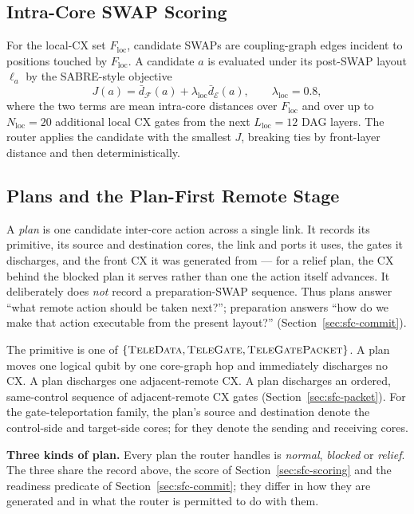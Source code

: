 \subsection{Intra-Core SWAP Scoring}
\label{sec:sfc-intra}

For the local-CX set $F_\mathrm{loc}$, candidate SWAPs are coupling-graph
edges incident to positions touched by $F_\mathrm{loc}$.  A candidate $a$ is
evaluated under its post-SWAP layout $\ell_a$ by the SABRE-style objective
\begin{equation}
J(a)=\bar d_{\mathcal F}(a)+\lambda_\mathrm{loc}\bar d_{\mathcal E}(a),
\qquad \lambda_\mathrm{loc}=0.8,
\label{eq:sfc-local}
\end{equation}
where the two terms are mean intra-core distances over $F_\mathrm{loc}$ and
over up to $N_\mathrm{loc}=20$ additional local CX gates from the next
$L_\mathrm{loc}=12$ DAG layers.  The router applies the candidate with the
smallest $J$, breaking ties by front-layer distance and then deterministically.

\subsection{Plans and the Plan-First Remote Stage}
\label{sec:sfc-plan-first}
\label{sec:sfc-relief}

A \emph{plan} is one candidate inter-core action across a single link.  It
records its primitive, its source and destination cores, the link and ports it
uses, the gates it discharges, and the front CX it was generated from --- for
a relief plan, the CX behind the blocked plan it serves rather than one the
action itself advances.  It deliberately does \emph{not} record a
preparation-SWAP sequence.  Thus plans answer ``what remote action should be
taken next?''; preparation answers ``how do we make that action executable
from the present layout?'' (Section~\ref{sec:sfc-commit}).

The primitive is one of $\{\textsc{TeleData}{},\textsc{TeleGate}{},\textsc{TeleGatePacket}{}\}$.
A \TeleData{} plan moves one logical qubit by one core-graph hop and
immediately discharges no CX.  A \TeleGate{} plan discharges one
adjacent-remote CX.  A \TeleGatePacket{} plan discharges an ordered,
same-control sequence of adjacent-remote CX gates
(Section~\ref{sec:sfc-packet}).  For the gate-teleportation
family, the plan's source and destination denote the control-side and
target-side cores; for \TeleData{} they denote the sending and receiving cores.

\textbf{Three kinds of plan.}  Every plan the router handles is
\emph{normal}, \emph{blocked} or \emph{relief}.  The three share the record
above, the score of Section~\ref{sec:sfc-scoring} and the readiness
predicate of Section~\ref{sec:sfc-commit}; they differ in how they are
generated and in what the router is permitted to do with them.

